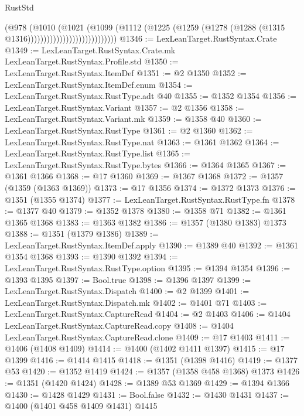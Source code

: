 \begin{lexlean}{RustStd}
\begin{coremodule}
                                        (@978
                                          (@1010
                                            (@1021
                                              (@1099
                                                (@1112
                                                  (@1225
                                                    (@1259
                                                      (@1278
                                                        (@1288
                                                          (@1315 @1316))))))))))))))))))))))))))))
@1346 := LexLeanTarget.RustSyntax.Crate
@1349 := LexLeanTarget.RustSyntax.Crate.mk LexLeanTarget.RustSyntax.Profile.std
@1350 := LexLeanTarget.RustSyntax.ItemDef
@1351 := @2 @1350
@1352 := LexLeanTarget.RustSyntax.ItemDef.enum
@1354 := LexLeanTarget.RustSyntax.RustType.adt @40
@1355 := @1352 @1354
@1356 := LexLeanTarget.RustSyntax.Variant
@1357 := @2 @1356
@1358 := LexLeanTarget.RustSyntax.Variant.mk
@1359 := @1358 @40
@1360 := LexLeanTarget.RustSyntax.RustType
@1361 := @2 @1360
@1362 := LexLeanTarget.RustSyntax.RustType.nat
@1363 := @1361 @1362
@1364 := LexLeanTarget.RustSyntax.RustType.list
@1365 := LexLeanTarget.RustSyntax.RustType.bytes
@1366 := @1364 @1365
@1367 := @1361 @1366
@1368 := @17 @1360
@1369 := @1367 @1368
@1372 := @1357 (@1359 (@1363 @1369))
@1373 := @17 @1356
@1374 := @1372 @1373
@1376 := @1351 (@1355 @1374)
@1377 := LexLeanTarget.RustSyntax.RustType.fn
@1378 := @1377 @40
@1379 := @1352 @1378
@1380 := @1358 @71
@1382 := @1361 @1365 @1368
@1383 := @1363 @1382
@1386 := @1357 (@1380 @1383) @1373
@1388 := @1351 (@1379 @1386)
@1389 := LexLeanTarget.RustSyntax.ItemDef.apply
@1390 := @1389 @40
@1392 := @1361 @1354 @1368
@1393 := @1390 @1392
@1394 := LexLeanTarget.RustSyntax.RustType.option
@1395 := @1394 @1354
@1396 := @1393 @1395
@1397 := Bool.true
@1398 := @1396 @1397
@1399 := LexLeanTarget.RustSyntax.Dispatch
@1400 := @2 @1399
@1401 := LexLeanTarget.RustSyntax.Dispatch.mk
@1402 := @1401 @71
@1403 := LexLeanTarget.RustSyntax.CaptureRead
@1404 := @2 @1403
@1406 := @1404 LexLeanTarget.RustSyntax.CaptureRead.copy
@1408 := @1404 LexLeanTarget.RustSyntax.CaptureRead.clone
@1409 := @17 @1403
@1411 := @1406 (@1408 @1409)
@1414 := @1400 (@1402 @1411 @1397)
@1415 := @17 @1399
@1416 := @1414 @1415
@1418 := @1351 (@1398 @1416)
@1419 := @1377 @53
@1420 := @1352 @1419
@1424 := @1357 (@1358 @458 @1368) @1373
@1426 := @1351 (@1420 @1424)
@1428 := @1389 @53 @1369
@1429 := @1394 @1366
@1430 := @1428 @1429
@1431 := Bool.false
@1432 := @1430 @1431
@1437 := @1400 (@1401 @458 @1409 @1431) @1415

\end{coremodule}
\end{lexlean}
